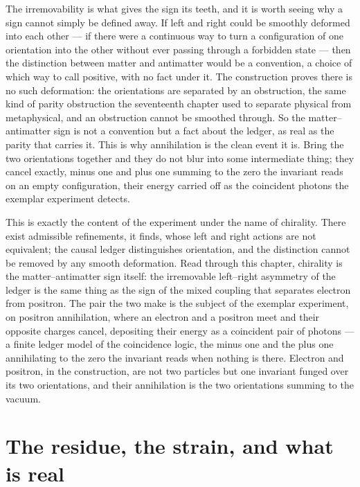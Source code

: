 The irremovability is what gives the sign its teeth, and it is worth seeing why a sign cannot simply be
defined away. If left and right could be smoothly deformed into each other --- if there were a
continuous way to turn a configuration of one orientation into the other without ever passing through a
forbidden state --- then the distinction between matter and antimatter would be a convention, a choice
of which way to call positive, with no fact under it. The construction proves there is no such
deformation: the orientations are separated by an obstruction, the same kind of parity obstruction the
seventeenth chapter used to separate physical from metaphysical, and an obstruction cannot be smoothed
through. So the matter--antimatter sign is not a convention but a fact about the ledger, as real as the
parity that carries it. This is why annihilation is the clean event it is. Bring the two orientations
together and they do not blur into some intermediate thing; they cancel exactly, minus one and plus one
summing to the zero the invariant reads on an empty configuration, their energy carried off as the
coincident photons the exemplar experiment detects.

This is exactly the content of the experiment under the name of chirality. There exist admissible
refinements, it finds, whose left and right actions are not equivalent; the causal ledger distinguishes
orientation, and the distinction cannot be removed by any smooth deformation. Read through this chapter,
chirality is the matter--antimatter sign itself: the irremovable left--right asymmetry of the ledger is
the same thing as the sign of the mixed coupling that separates electron from positron. The pair the two
make is the subject of the exemplar experiment, on positron annihilation, where an electron and a
positron meet and their opposite charges cancel, depositing their energy as a coincident pair of
photons --- a finite ledger model of the coincidence logic, the minus one and the plus one annihilating
to the zero the invariant reads when nothing is there. Electron and positron, in the construction, are
not two particles but one invariant funged over its two orientations, and their annihilation is the two
orientations summing to the vacuum.

\section{The residue, the strain, and what is real}
\label{se:the-residue-the-strain-and-what-is-real}

